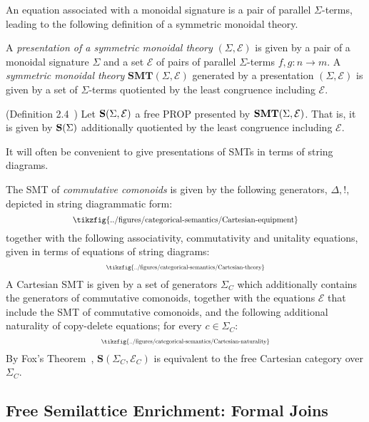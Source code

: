 An equation associated with a monoidal signature is a pair of parallel $\Sigma$-terms, leading to the following definition of a symmetric monoidal theory. 
\begin{definition}
A \textit{presentation of a symmetric monoidal theory} $(\Sigma, \mathcal{E})$ is given by a pair of a monoidal signature $\Sigma$ and a set $\mathcal{E}$ of pairs of parallel $\Sigma$-terms $f,g: n \to m$.
A \textit{symmetric monoidal theory} $\textbf{SMT}(\Sigma,\mathcal{E})$ generated by a presentation $(\Sigma, \mathcal{E})$ is given by a set of $\Sigma$-terms quotiented by the least congruence including $\mathcal{E}$.
\end{definition}

\begin{definition}(Definition 2.4~\cite{bonchi_string_2022-1})
Let $\mathbf{S}(\Sigma, \mathcal{E})$ a free PROP presented by $\mathbf{SMT}(\Sigma, \mathcal{E})$.
That is, it is given by $\mathbf{S}(\Sigma)$ additionally quotiented by the least congruence including $\mathcal{E}$.
\end{definition}

It will often be convenient to give presentations of SMTs in terms of string diagrams.
\begin{example}
The SMT of \textit{commutative comonoids} is given by the following generators, ${\Delta, !}$, depicted in string diagrammatic form:
\[
	\scalebox{0.8}{
  	 \tikzfig{../figures/categorical-semantics/Cartesian-equipment}
	}
\]
together with the following associativity, commutativity and unitality equations, given in terms of equations of string diagrams: 
\[
	\scalebox{0.6}{
	\tikzfig{../figures/categorical-semantics/Cartesian-theory}	
	}
\]
A Cartesian SMT is given by a set of generators $\Sigma_C$ which additionally contains the generators of commutative comonoids, together with the equations $\mathcal{E}$ that include the SMT of commutative comonoids, and the following additional naturality of copy-delete equations; for every $c \in \Sigma_C$:
\[
	\scalebox{0.6}{
	\tikzfig{../figures/categorical-semantics/Cartesian-naturality}
	}
\]
By Fox's Theorem~\cite{fox},  $\textbf{S}(\Sigma_C, \mathcal{E}_C)$ is equivalent to the free Cartesian category over $\Sigma_C$. 
\end{example}

\subsection{Free Semilattice Enrichment: Formal Joins}

